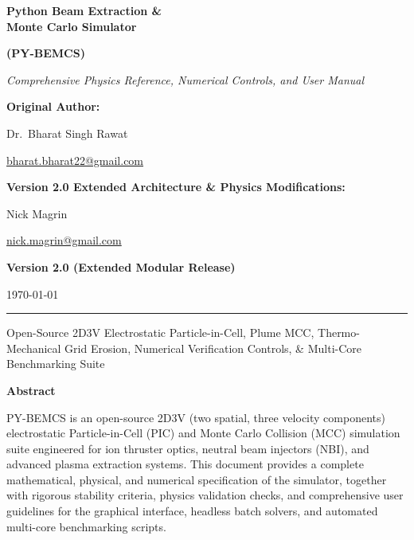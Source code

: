 \documentclass[11pt,a4paper]{article}
\newcommand{\PYBEMCS}{PY-BEMCS}
\begin{document}
\begin{titlepage}
\centering
\vspace*{1.5cm}

{\Huge\bfseries Python Beam Extraction \&\\[0.3em] Monte Carlo Simulator \par}
\vspace{0.4cm}
{\Large\bfseries (\PYBEMCS)\par}

\vspace{1.0cm}
{\large\textit{Comprehensive Physics Reference, Numerical Controls, and User Manual}\par}

\vspace{1.8cm}
{\large\textbf{Original Author:}\par}
{\large Dr.~Bharat Singh Rawat\par}
{\normalsize \href{mailto:bharat.bharat22@gmail.com}{bharat.bharat22@gmail.com}\par}

\vspace{0.8cm}
{\large\textbf{Version 2.0 Extended Architecture \& Physics Modifications:}\par}
{\large Nick Magrin\par}
{\normalsize \href{mailto:nick.magrin@gmail.com}{nick.magrin@gmail.com}\par}

\vspace{1.2cm}
{\normalsize \textbf{Version 2.0 (Extended Modular Release)}\par}
\vspace{0.2cm}
{\normalsize \today\par}

\vfill
\hrule
\vspace{0.5em}
{\small Open-Source 2D3V Electrostatic Particle-in-Cell, Plume MCC, Thermo-Mechanical Grid Erosion, Numerical Verification Controls, \& Multi-Core Benchmarking Suite}
\end{titlepage}

\begin{center}
{\Large\bfseries Abstract}
\end{center}
\vspace{0.5em}

\PYBEMCS{} is an open-source 2D3V (two spatial, three velocity components) electrostatic Particle-in-Cell (PIC) and Monte Carlo Collision (MCC) simulation suite engineered for ion thruster optics, neutral beam injectors (NBI), and advanced plasma extraction systems. This document provides a complete mathematical, physical, and numerical specification of the simulator, together with rigorous stability criteria, physics validation checks, and comprehensive user guidelines for the graphical interface, headless batch solvers, and automated multi-core benchmarking scripts.
\end{document}
